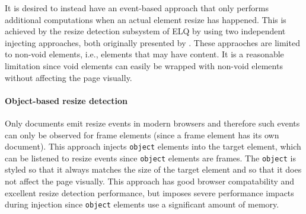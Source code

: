 \documentclass{acm_proc_article-sp}
\newcommand{\code}[1]{\texttt{#1}}
\newcommand{\elq}{ELQ}
\newcommand{\gls}[1]{#1}
\begin{document}


    It is desired to instead have an event-based approach that only performs additional computations when an actual element resize has happened.
    This is achieved by the resize detection subsystem of \elq{} by using two independent injecting approaches, both originally presented by \cite{backalley}.
    These appraoches are limited to non-void elements, i.e., elements that may have content.
    It is a reasonable limitation since void elements can easily be wrapped with non-void elements without affecting the page visually.

    \paragraph{Object-based resize detection}
    Only documents emit resize events in modern browsers and therefore such events can only be observed for frame elements (since a frame \gls{element} has its own \gls{document}).
    This approach injects \code{object} elements into the target element, which can be listened to resize events since \code{object} elements are frames.
    The \code{object} is styled so that it always matches the size of the target \gls{element} and so that it does not affect the page visually.
    This approach has good browser compatability and excellent resize detection performance, but imposes severe performance impacts during injection since \code{object} elements use a significant amount of memory.
\end{document}
